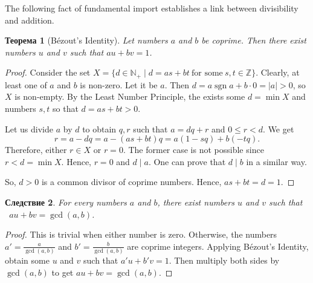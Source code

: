 \documentclass[12pt,notitlepage]{article}
\theoremstyle{plain}
\newtheorem{thm}{Теорема}[section]
\newtheorem{corr}[thm]{Следствие}
\theoremstyle{definition}
\theoremstyle{plain}
\newcommand{\N}{\mathbb{N}}
\newcommand{\Z}{\mathbb{Z}}
\newcommand{\1}{\mathbf{1}}
\newcommand{\0}{\mathbf{0}}
\newcommand{\dvd}{\mathop{\mid}}
\DeclareMathOperator{\sgn}{sgn}
\begin{document}
\noindent The following fact of fundamental import establishes a link between divisibility and addition.
\begin{thm}[B\'ezout's Identity]\label{L5:t1}
	Let numbers $a$ and $b$ be coprime. Then there exist numbers $u$ and $v$ such that $a u + b v = 1$.
\end{thm}
\begin{proof}
	Consider the set $X = \{ d \in \N_+  \mid  d = a s + b t\ \mbox{for some}\ s, t \in \Z \}$. Clearly, at least one of $a$ and $b$ is non-zero. Let it be $a$. Then $d = a \sgn a + b \cdot 0 = |a| > 0$, so $X$ is non-empty. By the Least Number Principle, the exists some $d = \min X$ and numbers $s,t$ so that $d = a s + b t > 0$.
	
	Let us divide $a$ by $d$ to obtain $q, r$ such that $a = d q + r$ and $0 \leq r < d$. We get
	$$r = a - d q = a - (a s + b t) q = a (1 - sq) + b(-tq).$$
	Therefore, either $r \in X$ or $r = 0$. The former case is not possible since $r < d = \min X$. Hence, $r = 0$ and $d \dvd a$. One can prove that $d \dvd b$ in a similar way.
	
	So, $d > 0$ is a common divisor of coprime numbers. Hence, $a s + b t = d = 1$.
\end{proof}

\begin{corr}\label{L5:bezout_int}
	For every numbers $a$ and $b$, there exist numbers $u$ and $v$ such that \ $a u + b v = \gcd(a,b)$.
\end{corr}
\begin{proof}
	This is trivial when either number is zero. Otherwise, the numbers $a' = \frac{a}{\gcd(a, b)}$ and $b' = \frac{b}{\gcd(a, b)}$ are coprime integers. Applying B\'ezout's Identity, obtain some $u$ and $v$ such that $a'u + b'v = 1$. Then multiply both sides by $\gcd(a,b)$ to get $a u + b v = \gcd(a, b)$.
\end{proof}
\end{document}
